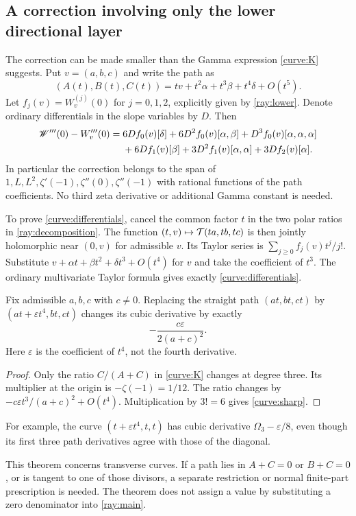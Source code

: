 \subsection{A correction involving only the lower directional layer}

The correction can be made smaller than the Gamma expression
\eqref{curve:K} suggests. Put $v=(a,b,c)$ and write the path as
\[
 (A(t),B(t),C(t))=tv+t^2\alpha+t^3\beta+t^4\delta+O(t^5).
\]
Let $f_j(v)=W_v^{(j)}(0)$ for $j=0,1,2$, explicitly given by
\eqref{ray:lower}. Denote ordinary differentials in the slope
variables by $D$. Then
\begin{align}
 \mathscr W'''(0)-W_v'''(0)={}&
 6Df_0(v)[\delta]+6D^2f_0(v)[\alpha,\beta]
                  +D^3f_0(v)[\alpha,\alpha,\alpha]\notag\\
 &+6Df_1(v)[\beta]+3D^2f_1(v)[\alpha,\alpha]
                  +3Df_2(v)[\alpha].
 \label{curve:differentials}
\end{align}
In particular the correction belongs to the span of
$1,L,L^2,\zeta'(-1),\zeta''(0),\zeta''(-1)$ with rational
functions of the path coefficients. No third zeta derivative or
additional Gamma constant is needed.

To prove \eqref{curve:differentials}, cancel the common factor $t$
in the two polar ratios in \eqref{ray:decomposition}. The function
$(t,v)\mapsto\mathcal T(ta,tb,tc)$ is then jointly holomorphic near
$(0,v)$ for admissible $v$. Its Taylor series is
$\sum_{j\ge0}f_j(v)t^j/j!$. Substitute
$v+\alpha t+\beta t^2+\delta t^3+O(t^4)$ for $v$ and take
the coefficient of $t^3$. The ordinary multivariate Taylor formula
gives exactly \eqref{curve:differentials}.

\begin{proposition}\label{prop:sharpcurve}
Fix admissible $a,b,c$ with $c\ne0$. Replacing the straight path
$(at,bt,ct)$ by $(at+\varepsilon t^4,bt,ct)$ changes its cubic
derivative by exactly
\begin{equation}\label{curve:sharp}
 -\frac{c\varepsilon}{2(a+c)^2}.
\end{equation}
Here $\varepsilon$ is the coefficient of $t^4$, not the fourth derivative.
\end{proposition}
\begin{proof}
Only the ratio $C/(A+C)$ in \eqref{curve:K} changes at degree three.
Its multiplier at the origin is $-\zeta(-1)=1/12$. The ratio changes by
$-c\varepsilon t^3/(a+c)^2+O(t^4)$. Multiplication by $3!=6$
gives \eqref{curve:sharp}.
\end{proof}

For example, the curve $(t+\varepsilon t^4,t,t)$ has cubic
derivative $\Omega_3-\varepsilon/8$, even though its first three
path derivatives agree with those of the diagonal.

This theorem concerns transverse curves. If a path lies in $A+C=0$
or $B+C=0$, or is tangent to one of those divisors, a separate
restriction or normal finite-part prescription is needed. The theorem
does not assign a value by substituting a zero denominator into
\eqref{ray:main}.
